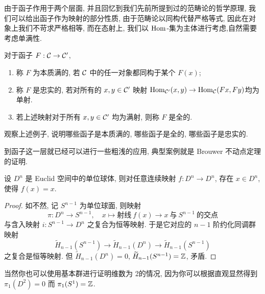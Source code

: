 由于函子作用于两个层面, 并且回忆到我们先前所提到过的范畴论的哲学原理, 我们可以给出函子作为映射的部分性质, 由于范畴论以同构代替严格等式, 因此在对象上我们不苛求严格相等, 而在态射上, 我们以 $\operatorname{Hom}$-集为主体进行考虑,自然需要考虑单满性.
\begin{definition}
    对于函子 $F: \cal{C} \to \cal{C}'$,
    \begin{enumerate}
        \item 称 $F$ 为本质满的, 若 $\cal{C}$ 中的任一对象都同构于某个 $F(x)$;
        \item 称 $F$ 是忠实的, 若对所有的 $x,y \in \cal{C}'$ 映射 $\operatorname{Hom}_{\cal{C}'}(x,y) \to \operatorname{Hom}_{\cal{C}}(Fx,Fy)$均为单射.
        \item 若上述映射对于所有 $x,y \in \cal{C}'$ 均为满射, 则称 $F$ 是全的.
    \end{enumerate}
\end{definition}
\begin{exercise}
    观察上述例子, 说明哪些函子是本质满的, 哪些函子是全的, 哪些函子是忠实的.
\end{exercise}
到函子这一层就已经可以进行一些粗浅的应用, 典型案例就是 Brouwer 不动点定理的证明.
\begin{theorem}\label{定理:Brouwer}
    设 $D^n$ 是 Euclid 空间中的单位球体,
    则对任意连续映射 $f \colon D^n \to D^n$,
    存在 $x \in D^n$, 使得 $f(x) = x$.
\end{theorem}
\begin{proof}
    如不然, 记 $S^{n-1}$ 为单位球面, 则映射
    \[
        \pi \colon D^n \to S^{n-1}, \quad
        x \mapsto \text{射线}\ f(x) \to x\ \text{与}\ S^{n-1}\ \text{的交点}
    \]
    与含入映射 $i \colon S^{n-1} \to D^n$ 之复合为恒等映射.
    于是它对应的 $n-1$ 阶约化同调群映射 
    \[
        \widetilde H_{n-1}(S^{n-1}) \to
        \widetilde H_{n-1}(D^n) \to
        \widetilde H_{n-1}(S^{n-1})
    \]
    之复合是恒等映射. 但 $\widetilde H_{n-1}(D^n) = 0$, 
    $\widetilde H_{n-1}(S^{n-1}) = \mathbb{Z}$, 矛盾.
\end{proof}
当然你也可以使用基本群进行证明维数为 2的情况, 因为你可以根据直观显然得到 $\pi_1(D^2) = 0$ 而 $\pi_1(S^1) = \mathbb{Z}$.
